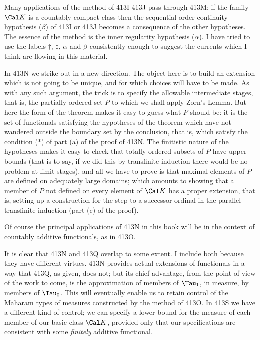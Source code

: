 {Many applications of the method of 413I-413J pass through 413M;  if the
family $\Cal K$ is a countably compact class then the sequential
order-continuity hypothesis ($\beta$) of 413I or 413J becomes a
consequence
of the other hypotheses.   The essence of the method is the inner
regularity hypothesis ($\alpha$).   I have tried to use the labels
$\dagger$, $\ddagger$, $\alpha$ and $\beta$ consistently enough to
suggest the currents which I think are flowing in this material.

In 413N we strike out in a new direction.   The object here is to build
an extension which is not going to be unique, and for which choices will
have to be made.   As with any such argument, the trick is to specify
the allowable intermediate stages, that is, the partially ordered set
$P$ to which we shall apply Zorn's Lemma.   But here the form of the
theorem makes
it easy to guess what $P$ should be:  it is the set of functionals
satisfying the hypotheses of the theorem which have not wandered outside
the boundary set by the conclusion, that is, which satisfy the condition
($*$) of part (a) of the proof of 413N.   The finitistic nature of the
hypotheses makes it easy to check that totally ordered subsets of $P$
have upper bounds
(that is to say, if we did this by transfinite induction there would be
no problem at limit stages), and all we have to prove is that maximal
elements of $P$ are defined on adequately large domains;  which amounts
to showing
that a member of $P$ not defined on every element of $\Cal K$ has a
proper extension, that is, setting up a construction for the step to a
successor ordinal in the parallel transfinite induction (part (c) of the
proof).

Of course the principal applications of 413N in this book will be in the
context of countably additive functionals, as in 413O.

It is clear that 413N and 413Q overlap to some extent.   I include both
because they have different virtues.   413N provides actual extensions of
functionals in a way that 413Q, as given, does not;
but its chief advantage,
from the point of view of the work to come, is the approximation of
members of $\Tau_1$, in measure, by members of $\Tau_0$.   This will
eventually enable us to retain control of the Maharam types of measures
constructed by
the method of 413O.   In 413S we have a different kind of control;  we
can specify a lower bound for the measure of each member of our basic
class $\Cal K$, provided only that our specifications are consistent
with some {\it finitely} additive functional.

}%

\discrpage

